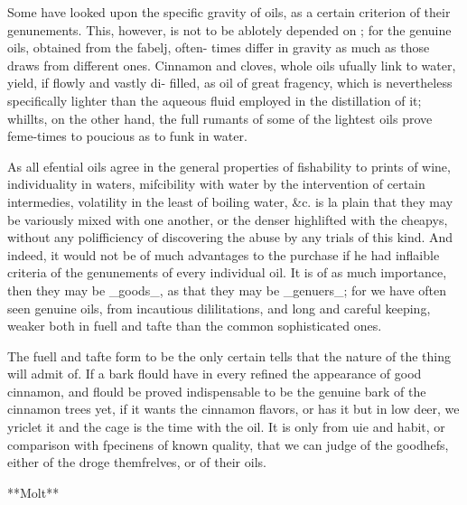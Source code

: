 Some have looked upon the specific gravity of oils, as a certain criterion of their genunements. This, however, is not to be ablotely depended on ; for the genuine oils, obtained from the fabelj, often- times differ in gravity as much as those draws from different ones. Cinnamon and cloves, whole oils ufually link to water, yield, if flowly and vastly di- filled, as oil of great fragency, which is nevertheless specifically lighter than the aqueous fluid employed in the distillation of it; whillts, on the other hand, the full rumants of some of the lightest oils prove feme-times to poucious as to funk in water.\par\medskip
As all efential oils agree in the general properties of fishability to prints of wine, individuality in waters, mifcibility with water by the intervention of certain intermedies, volatility in the least of boiling water, \&c. is la plain that they may be variously mixed with one another, or the denser highlifted with the cheapys, without any polifficiency of discovering the abuse by any trials of this kind. And indeed, it would not be of much advantages to the purchase if he had inflaible criteria of the genunements of every individual oil. It is of as much importance, then they may be \_goods\_, as that they may be \_genuers\_; for we have often seen genuine oils, from incautious dililitations, and long and careful keeping, weaker both in fuell and tafte than the common sophisticated ones.\par\medskip
The fuell and tafte form to be the only certain tells that the nature of the thing will admit of. If a bark flould have in every refined the appearance of good cinnamon, and flould be proved indispensable to be the genuine bark of the cinnamon trees yet, if it wants the cinnamon flavors, or has it but in low deer, we yriclet it and the cage is the time with the oil. It is only from uie and habit, or comparison with fpecinens of known quality, that we can judge of the goodhefs, either of the droge themfrelves, or of their oils.\par\medskip
**Molt**\par\medskip
